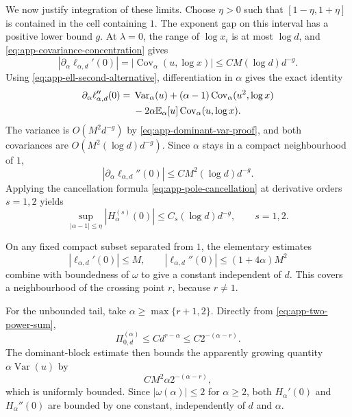 \documentclass[aps,pra,11pt,onecolumn,nofootinbib,tightenlines]{revtex4-2}
\theoremstyle{definition}
\begin{document}
We now justify integration of these limits.  Choose $\eta>0$ such that $[1-\eta,1+\eta]$ is contained in the cell containing $1$.  The exponent gap on this interval has a positive lower bound $g$.  At $\lambda=0$, the range of $\log x_i$ is at most $\log d$, and \eqref{eq:app-covariance-concentration} gives
\begin{equation}
 |\partial_\alpha\ell_{\alpha,d}'(0)|
 =|\operatorname{Cov}_\alpha(u,\log x)|
 \leq C M(\log d)d^{-g}.
 \label{eq:app-two-alpha-first}
\end{equation}
Using \eqref{eq:app-ell-second-alternative}, differentiation in $\alpha$ gives the exact identity
\begin{align}
 \partial_\alpha\ell_{\alpha,d}''(0)
 ={}&\operatorname{Var}_\alpha(u)
 +(\alpha-1)\operatorname{Cov}_\alpha(u^2,\log x)
 \notag\\
 &-2\alpha\mathbb E_\alpha[u]
  \operatorname{Cov}_\alpha(u,\log x).
 \label{eq:app-alpha-ell-second-exact}
\end{align}
The variance is $O(M^2d^{-g})$ by \eqref{eq:app-dominant-var-proof}, and both covariances are $O(M^2(\log d)d^{-g})$.  Since $\alpha$ stays in a compact neighbourhood of $1$,
\begin{equation}
 |\partial_\alpha\ell_{\alpha,d}''(0)|
 \leq C M^2(\log d)d^{-g}.
 \label{eq:app-two-alpha-second}
\end{equation}
Applying the cancellation formula \eqref{eq:app-pole-cancellation} at derivative
orders $s=1,2$ yields
\begin{equation}
 \sup_{|\alpha-1|\leq\eta}|H_\alpha^{(s)}(0)|
 \leq C_s(\log d)d^{-g},
 \qquad s=1,2.
 \label{eq:app-two-near-one}
\end{equation}

On any fixed compact subset separated from $1$, the elementary estimates
\begin{equation}
 |\ell_{\alpha,d}'(0)|\leq M,
 \qquad
 |\ell_{\alpha,d}''(0)|\leq(1+4\alpha)M^2
 \label{eq:app-rough-ell-bounds}
\end{equation}
combine with boundedness of $\omega$ to give a constant independent of $d$.  This covers a neighbourhood of the crossing point $r$, because $r\neq1$.

For the unbounded tail, take $\alpha\geq\max\{r+1,2\}$.  Directly from \eqref{eq:app-two-power-sum},
\begin{equation}
 \Pi_{0,d}^{(\alpha)}
 \leq C d^{r-\alpha}
 \leq C2^{-(\alpha-r)}.
 \label{eq:app-two-tail-weight}
\end{equation}
The dominant-block estimate then bounds the apparently growing quantity
$\alpha\operatorname{Var}(u)$ by
\begin{equation}
 C M^2\alpha2^{-(\alpha-r)},
 \label{eq:app-two-tail-alpha-var}
\end{equation}
which is uniformly bounded.  Since $|\omega(\alpha)|\leq2$ for $\alpha\geq2$, both $H_\alpha'(0)$ and $H_\alpha''(0)$ are bounded by one constant, independently of $d$ and $\alpha$.
\end{document}
